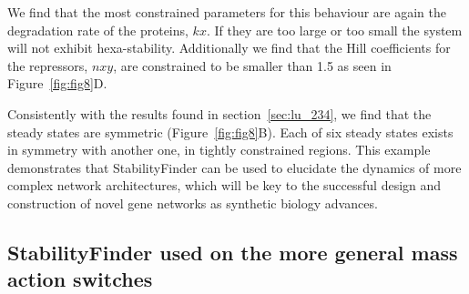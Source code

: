 We find that the most constrained parameters for this behaviour are again the degradation rate of the proteins, $kx$. If they are too large or too small the system will not exhibit hexa-stability. Additionally we find that the Hill coefficients for the repressors, $nxy$, are constrained to be smaller than 1.5 as seen in Figure~\ref{fig:fig8}D. 

Consistently with the results found in section~\ref{sec:lu_234}, we find that the steady states are symmetric (Figure~\ref{fig:fig8}B). Each of six steady states exists in symmetry with another one, in tightly constrained regions. This example demonstrates that StabilityFinder can be used to elucidate the dynamics of more complex network architectures, which will be key to the successful design and construction of novel gene networks as synthetic biology advances.


\clearpage
\subsection{StabilityFinder used on the more general mass action switches}
\label{sec:ma_sw}						

